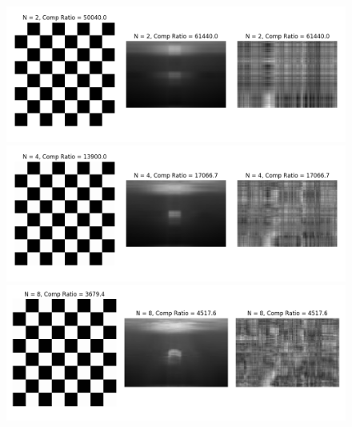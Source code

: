 \documentclass[12p,a4paper]{article}
\begin{document}
\begin{figure}[H]
    \centering
    \includegraphics[width=1.0\linewidth]{../figs/img0.png}
    \includegraphics[width=1.0\linewidth]{../figs/img1.png}
    \includegraphics[width=1.0\linewidth]{../figs/img2.png}
\end{figure}
\end{document}
